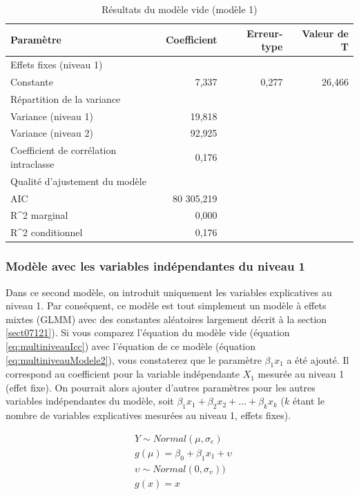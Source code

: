 \documentclass[
  11pt,
  french,
]{book}
\begin{document}
\begin{table}

\caption{\label{tab:TableauModeleVide}Résultats du modèle vide (modèle 1)}
\centering
\fontsize{8}{10}\selectfont
\begin{tabular}[t]{lrrr}
\toprule
Paramètre & Coefficient & Erreur-type & Valeur de T\\
\midrule
Effets fixes (niveau 1) &  &  & \\
Constante & 7,337 & 0,277 & 26,466\\
Répartition de la variance &  &  & \\
Variance (niveau 1) & 19,818 &  & \\
Variance (niveau 2) & 92,925 &  & \\
\addlinespace
Coefficient de corrélation intraclasse & 0,176 &  & \\
Qualité d'ajustement du modèle &  &  & \\
AIC & 80 305,219 &  & \\
R\textasciicircum{2} marginal & 0,000 &  & \\
R\textasciicircum{2} conditionnel & 0,176 &  & \\
\bottomrule
\end{tabular}
\end{table}

\hypertarget{sect08222}{%
\subsubsection{Modèle avec les variables indépendantes du niveau 1}\label{sect08222}}

Dans ce second modèle, on introduit uniquement les variables explicatives au niveau 1. Par conséquent, ce modèle est tout simplement un modèle à effets mixtes (GLMM) avec des constantes aléatoires largement décrit à la section \ref{sect07121}). Si vous comparez l'équation du modèle vide (équation \eqref{eq:multiniveauIcc}) avec l'équation de ce modèle (équation \eqref{eq:multiniveauModele2}), vous constaterez que le paramètre \(\beta_1 x_1\) a été ajouté. Il correspond au coefficient pour la variable indépendante \(X_1\) mesurée au niveau 1 (effet fixe). On pourrait alors ajouter d'autres paramètres pour les autres variables indépendantes du modèle, soit \(\beta_1 x_1 + \beta_2 x_2+ \ldots + \beta_k x_k\) (\(k\) étant le nombre de variables explicatives mesurées au niveau 1, effets fixes).

\footnotesize

\begin{equation}
\begin{aligned}
&Y \sim Normal(\mu,\sigma_e)\\
&g(\mu) = \beta_0 + \beta_1 x_1 + \upsilon \\
&\upsilon \sim Normal(0, \sigma_{\upsilon})) \\
&g(x) = x
\end{aligned}
\label{eq:multiniveauModele2}
\end{equation}
\normalsize
\end{document}
